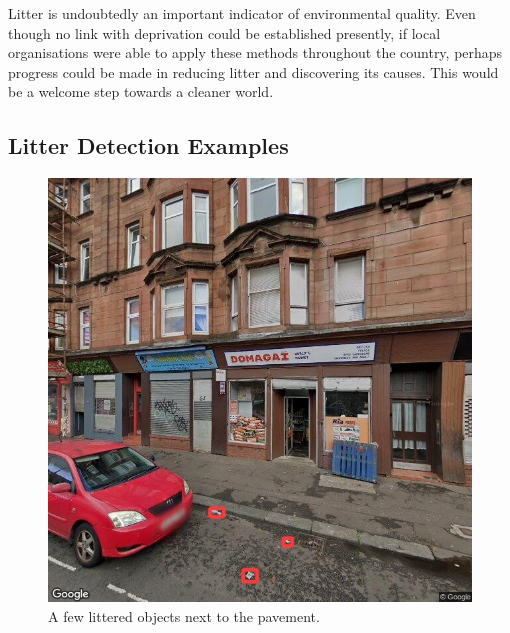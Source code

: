 \documentclass{thesis}
\begin{document}
Litter is undoubtedly an important indicator of environmental quality\cite{household-survey-2019}. Even though no link with deprivation could be established presently, if local organisations were able to apply these methods throughout the country, perhaps progress could be made in reducing litter and discovering its causes. This would be a welcome step towards a cleaner world.


\begin{appendices}

\chapter{Litter Detection Examples}

\begin{figure}[h!]
    \centering
    \includegraphics[scale=0.375]{images/good-three.jpg}
    \caption{A few littered objects next to the pavement.}
\end{figure}


\end{appendices}
\end{document}
